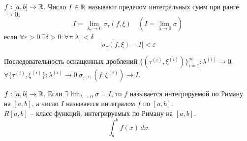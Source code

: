 \begin{figure*}[h]
	\centering
	\def\svgwidth{0.5\columnwidth}
	
\end{figure*}

\begin{Def}
	$f : [a, b] \to \mathbb{R}$. Число $I \in \mathbb{R}$ называют пределом интегральных сумм при ранге $\to 0 :$
	\[I = \lim_{\lambda_\tau \to 0} \sigma_\tau (f, \xi) \quad (I = \lim_{\lambda \to 0} \sigma)\]
	если $\forall \varepsilon > 0 \ \exists \delta > 0 : \forall \tau : \lambda_\tau < \delta$
	\[|\sigma_\tau (f, \xi) - I| < \varepsilon\] 
\end{Def}

\begin{Rem}
	Последовательность оснащенных дроблений $\{(\tau^{(i)}, \xi^{(i)})\}_{i = 1}^\infty : \lambda^{(i)} \to 0$.
	$\forall \{\tau^{(i)}, \xi^{(i)}\} : \lambda^{(i)} \to 0 \ \sigma_{\tau^{(i)}}(f, \xi^{(i)}) \to I$.  
\end{Rem}

\begin{Def}
	$f : [a, b] \to \mathbb{R}$. Если $\exists \lim_{\lambda \to 0} \sigma = I $, то $f$ называется интегрируемой по Риману на $[a, b]$, а число $I$ называется интегралом $f$ по $[a, b]$. \\
	$R[a, b]$ -- класс функций, интегрируемых по Риману на $[a, b]$.
	\[\int_a^b f(x)\,dx\]
\end{Def}

